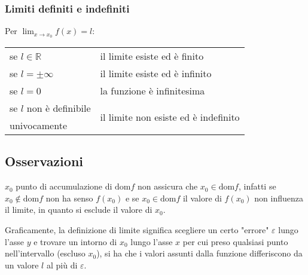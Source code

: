 \documentclass[a4paper]{article}
\newcommand\dom{\text{dom}}
\begin{document}
\subsubsection*{Limiti definiti e indefiniti}
Per \(\displaystyle \lim_{x \to x_0} f(x) = l\):
\begin{center}
	\begin{tabular}{l l}
		se \(l \in \mathbb{R}\) & il limite esiste ed è finito \\
		se \(l = \pm \infty\) & il limite esiste ed è infinito \\
		se \(l = 0\) & la funzione è infinitesima \\
		se \(l\) non è definibile & \multirow{2}{*}{il limite non esiste ed è indefinito} \\
		univocamente &
	\end{tabular}
\end{center}


\subsection*{Osservazioni}
\(x_0\) punto di accumulazione di \(\dom f\) non assicura che \(x_0 \in \dom f\), infatti se \(x_0 \notin \dom f\) non ha senso \(f(x_0)\) e
se \(x_0 \in \dom f\) il valore di \(f(x_0)\) non influenza il limite, in quanto si esclude il valore di \(x_0\).

Graficamente, la definizione di limite significa scegliere un certo "errore" \(\varepsilon\) lungo l'asse \(y\) e trovare un intorno di \(x_0\) lungo l'asse \(x\) per cui
preso qualsiasi punto nell'intervallo (escluso \(x_0\)), si ha che i valori assunti dalla funzione differiscono da un valore \(l\) al più di \(\varepsilon\).

\newpage
\end{document}
